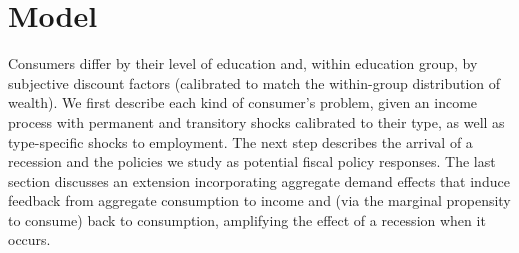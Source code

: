 \documentclass[\econtexRoot/HAFiscal]{subfiles}
\begin{document}
\notinsubfile{\renewcommand{\econtexRoot}{.}}

\hypertarget{model}{}\par\section{Model}
\notinsubfile{\label{sec:model}}

Consumers differ by their level of education and, within education group, by subjective discount factors (calibrated to match the within-group distribution of wealth). We first describe each kind of consumer's problem, given an income process with permanent and transitory shocks calibrated to their type, as well as type-specific shocks to employment. The next step describes the arrival of a recession and the policies we study as potential fiscal policy responses. The last section discusses an extension incorporating aggregate demand effects that induce feedback from aggregate consumption to income and (via the marginal propensity to consume) back to consumption, amplifying the effect of a recession when it occurs. 
\end{document}
